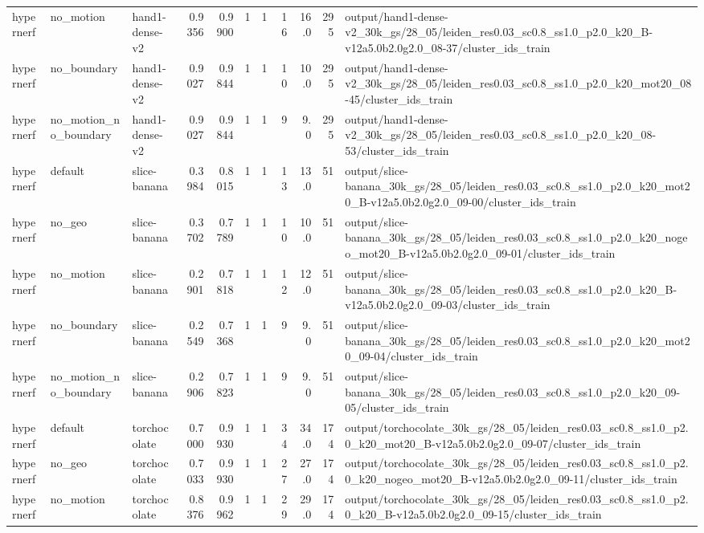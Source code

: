 \documentclass[10pt]{article}
\begin{document}
\begin{longtable}{lllrrrrrrrp{8cm}}
hypernerf & no\_motion & hand1-dense-v2 & 0.9356 & 0.9900 & 1 & 1 & 16 & 16.0 & 295 & output/hand1-dense-v2\_30k\_gs/28\_05/leiden\_res0.03\_sc0.8\_ss1.0\_p2.0\_k20\_B-v12a5.0b2.0g2.0\_08-37/cluster\_ids\_train \\
hypernerf & no\_boundary & hand1-dense-v2 & 0.9027 & 0.9844 & 1 & 1 & 10 & 10.0 & 295 & output/hand1-dense-v2\_30k\_gs/28\_05/leiden\_res0.03\_sc0.8\_ss1.0\_p2.0\_k20\_mot20\_08-45/cluster\_ids\_train \\
hypernerf & no\_motion\_no\_boundary & hand1-dense-v2 & 0.9027 & 0.9844 & 1 & 1 & 9 & 9.0 & 295 & output/hand1-dense-v2\_30k\_gs/28\_05/leiden\_res0.03\_sc0.8\_ss1.0\_p2.0\_k20\_08-53/cluster\_ids\_train \\
hypernerf & default & slice-banana & 0.3984 & 0.8015 & 1 & 1 & 13 & 13.0 & 51 & output/slice-banana\_30k\_gs/28\_05/leiden\_res0.03\_sc0.8\_ss1.0\_p2.0\_k20\_mot20\_B-v12a5.0b2.0g2.0\_09-00/cluster\_ids\_train \\
hypernerf & no\_geo & slice-banana & 0.3702 & 0.7789 & 1 & 1 & 10 & 10.0 & 51 & output/slice-banana\_30k\_gs/28\_05/leiden\_res0.03\_sc0.8\_ss1.0\_p2.0\_k20\_nogeo\_mot20\_B-v12a5.0b2.0g2.0\_09-01/cluster\_ids\_train \\
hypernerf & no\_motion & slice-banana & 0.2901 & 0.7818 & 1 & 1 & 12 & 12.0 & 51 & output/slice-banana\_30k\_gs/28\_05/leiden\_res0.03\_sc0.8\_ss1.0\_p2.0\_k20\_B-v12a5.0b2.0g2.0\_09-03/cluster\_ids\_train \\
hypernerf & no\_boundary & slice-banana & 0.2549 & 0.7368 & 1 & 1 & 9 & 9.0 & 51 & output/slice-banana\_30k\_gs/28\_05/leiden\_res0.03\_sc0.8\_ss1.0\_p2.0\_k20\_mot20\_09-04/cluster\_ids\_train \\
hypernerf & no\_motion\_no\_boundary & slice-banana & 0.2906 & 0.7823 & 1 & 1 & 9 & 9.0 & 51 & output/slice-banana\_30k\_gs/28\_05/leiden\_res0.03\_sc0.8\_ss1.0\_p2.0\_k20\_09-05/cluster\_ids\_train \\
hypernerf & default & torchocolate & 0.7000 & 0.9930 & 1 & 1 & 34 & 34.0 & 174 & output/torchocolate\_30k\_gs/28\_05/leiden\_res0.03\_sc0.8\_ss1.0\_p2.0\_k20\_mot20\_B-v12a5.0b2.0g2.0\_09-07/cluster\_ids\_train \\
hypernerf & no\_geo & torchocolate & 0.7033 & 0.9930 & 1 & 1 & 27 & 27.0 & 174 & output/torchocolate\_30k\_gs/28\_05/leiden\_res0.03\_sc0.8\_ss1.0\_p2.0\_k20\_nogeo\_mot20\_B-v12a5.0b2.0g2.0\_09-11/cluster\_ids\_train \\
hypernerf & no\_motion & torchocolate & 0.8376 & 0.9962 & 1 & 1 & 29 & 29.0 & 174 & output/torchocolate\_30k\_gs/28\_05/leiden\_res0.03\_sc0.8\_ss1.0\_p2.0\_k20\_B-v12a5.0b2.0g2.0\_09-15/cluster\_ids\_train \\

\end{longtable}
\end{document}
